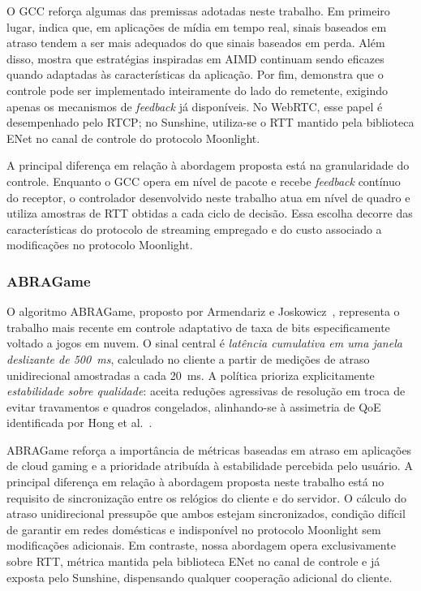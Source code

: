 \documentclass[conference]{IEEEtran}
\begin{document}
O GCC reforça algumas das premissas adotadas neste trabalho. Em primeiro lugar, indica que, em aplicações de mídia em tempo real, sinais baseados em atraso tendem a ser mais adequados do que sinais baseados em perda. Além disso, mostra que estratégias inspiradas em AIMD continuam sendo eficazes quando adaptadas às características da aplicação. Por fim, demonstra que o controle pode ser implementado inteiramente do lado do remetente, exigindo apenas os mecanismos de \emph{feedback} já disponíveis. No WebRTC, esse papel é desempenhado pelo RTCP; no Sunshine, utiliza-se o RTT mantido pela biblioteca ENet no canal de controle do protocolo Moonlight.

A principal diferença em relação à abordagem proposta está na granularidade do controle. Enquanto o GCC opera em nível de pacote e recebe \emph{feedback} contínuo do receptor, o controlador desenvolvido neste trabalho atua em nível de quadro e utiliza amostras de RTT obtidas a cada ciclo de decisão. Essa escolha decorre das características do protocolo de streaming empregado e do custo associado a modificações no protocolo Moonlight.

\subsubsection{ABRAGame}

O algoritmo ABRAGame, proposto por Armendariz e
Joskowicz~\cite{abragame}, representa o trabalho mais recente em
controle adaptativo de taxa de bits especificamente voltado a
jogos em nuvem. O sinal central é \emph{latência cumulativa em
uma janela deslizante de \SI{500}{\milli\second}}, calculado no
cliente a partir de medições de atraso unidirecional amostradas
a cada \SI{20}{\milli\second}. A política prioriza
explicitamente \emph{estabilidade sobre qualidade}: aceita
reduções agressivas de resolução em troca de evitar travamentos
e quadros congelados, alinhando-se à assimetria de QoE
identificada por Hong et al.~\cite{hong2015}.

ABRAGame reforça a importância de métricas baseadas em atraso em aplicações de cloud gaming e a prioridade atribuída à estabilidade percebida pelo usuário. A principal diferença em relação à abordagem proposta neste trabalho está no requisito de sincronização entre os relógios do cliente e do servidor. O cálculo do atraso unidirecional pressupõe que ambos estejam sincronizados, condição difícil de garantir em redes domésticas e indisponível no protocolo Moonlight sem modificações adicionais. Em contraste, nossa abordagem opera exclusivamente sobre RTT, métrica mantida pela biblioteca ENet no canal de controle e já exposta pelo Sunshine, dispensando qualquer cooperação adicional do cliente.
\end{document}
